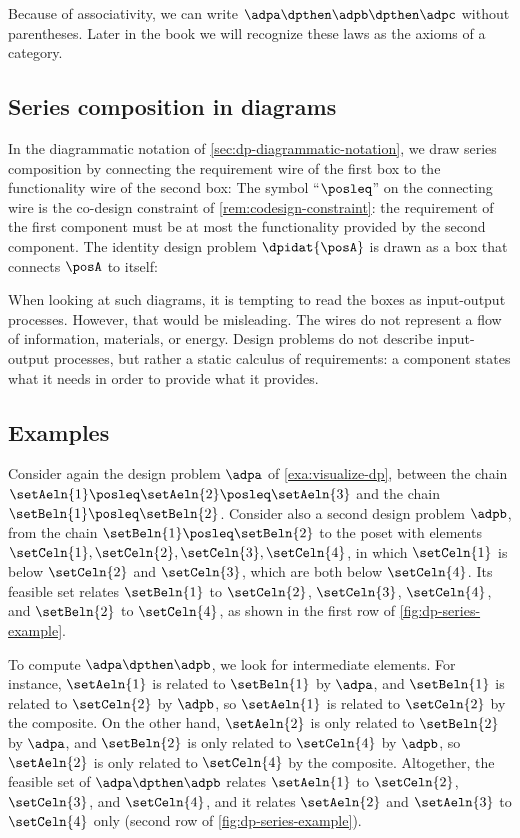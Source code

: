 Because of associativity, we can write $\adpa \dpthen \adpb \dpthen \adpc$ without parentheses.
Later in the book we will recognize these laws as the axioms of a category.

\subsection{Series composition in diagrams}

In the diagrammatic notation of \cref{sec:dp-diagrammatic-notation}, we draw series composition by connecting the requirement wire of the first box to the functionality wire of the second box:
%
%
The symbol ``$\posleq$'' on the connecting wire is the co-design constraint of \cref{rem:codesign-constraint}: the requirement of the first component must be at most the functionality provided by the second component.
The identity design problem $\dpidat{\posA}$ is drawn as a box that connects $\posA$ to itself:
%

When looking at such diagrams, it is tempting to read the boxes as input-output processes.
However, that would be misleading.
The wires do not represent a flow of information, materials, or energy.
Design problems do not describe input-output processes, but rather a static calculus of requirements: a component states what it needs in order to provide what it provides.

\subsection{Examples}

\begin{example}
    \label{exa:dp-series-finite}
    Consider again the design problem $\adpa$ of \cref{exa:visualize-dp}, between the chain $\setAeln{1} \posleq \setAeln{2} \posleq \setAeln{3}$ and the chain $\setBeln{1} \posleq \setBeln{2}$.
    Consider also a second design problem $\adpb$, from the chain $\setBeln{1} \posleq \setBeln{2}$ to the poset with elements $\setCeln{1}, \setCeln{2}, \setCeln{3}, \setCeln{4}$, in which $\setCeln{1}$ is below $\setCeln{2}$ and $\setCeln{3}$, which are both below $\setCeln{4}$.
    Its feasible set relates $\setBeln{1}$ to $\setCeln{2}$, $\setCeln{3}$, $\setCeln{4}$, and $\setBeln{2}$ to $\setCeln{4}$, as shown in the first row of \cref{fig:dp-series-example}.

    To compute $\adpa \dpthen \adpb$, we look for intermediate elements.
    For instance, $\setAeln{1}$ is related to $\setBeln{1}$ by $\adpa$, and $\setBeln{1}$ is related to $\setCeln{2}$ by $\adpb$, so $\setAeln{1}$ is related to $\setCeln{2}$ by the composite.
    On the other hand, $\setAeln{2}$ is only related to $\setBeln{2}$ by $\adpa$, and $\setBeln{2}$ is only related to $\setCeln{4}$ by $\adpb$, so $\setAeln{2}$ is only related to $\setCeln{4}$ by the composite.
    Altogether, the feasible set of $\adpa \dpthen \adpb$ relates $\setAeln{1}$ to $\setCeln{2}$, $\setCeln{3}$, and $\setCeln{4}$, and it relates $\setAeln{2}$ and $\setAeln{3}$ to $\setCeln{4}$ only (second row of \cref{fig:dp-series-example}).
\end{example}


